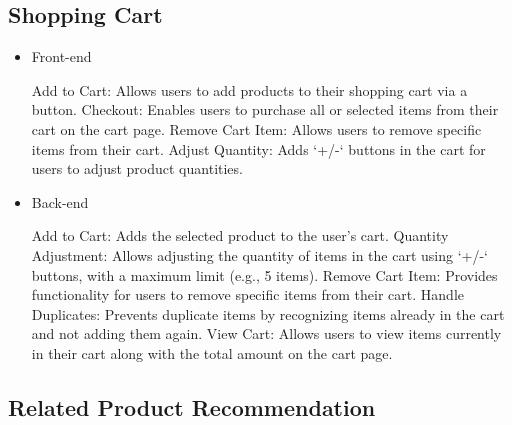 \documentclass[conference]{IEEEtran}
\begin{document}
\subsection{Shopping Cart}

\begin{itemize}
\setlength{\parindent}{2ex}
\item Front-end

Add to Cart: Allows users to add products to their shopping cart via a button. \newline\hspace*{1.2ex}
Checkout: Enables users to purchase all or selected items from their cart on the cart page. \newline\hspace*{1.2ex}
Remove Cart Item: Allows users to remove specific items from their cart. \newline\hspace*{1.2ex}
Adjust Quantity: Adds `+/-` buttons in the cart for users to adjust product quantities.

\item Back-end

Add to Cart: Adds the selected product to the user's cart.\newline\hspace*{1.2ex}
Quantity Adjustment: Allows adjusting the quantity of items in the cart using `+/-` buttons, with a maximum limit (e.g., 5 items). \newline\hspace*{1.2ex}
Remove Cart Item: Provides functionality for users to remove specific items from their cart. \newline\hspace*{1.2ex}
Handle Duplicates: Prevents duplicate items by recognizing items already in the cart and not adding them again. \newline\hspace*{1.2ex}
View Cart: Allows users to view items currently in their cart along with the total amount on the cart page.

\end{itemize}

\subsection{Related Product Recommendation}
\end{document}

